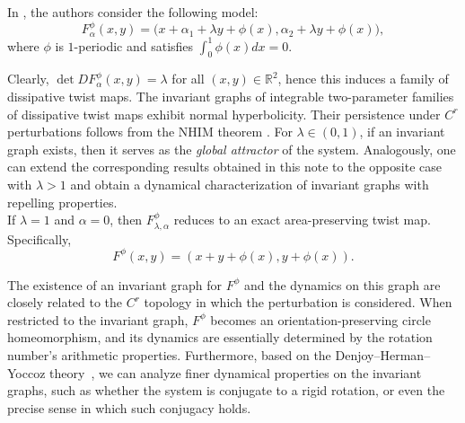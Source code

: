 \documentclass{amsart}
\newcommand{\R}{\mathbb{R}}
\newcommand{\al}{\alpha}
\theoremstyle{definition}
\begin{document}
 In \cite{SoW}, the authors consider the following model:
\begin{equation}\label{Fp}
F^\phi_{\alpha}(x,y) = \big(x + \alpha_1 + \lambda y + \phi(x), \alpha_2 + \lambda y + \phi(x)\big),
\end{equation}
where $\phi$ is $1$-periodic and satisfies $\int_{0}^1 \phi(x) dx = 0$.

Clearly, $\det DF_{\al}^\phi(x,y)=\lambda$ for all $(x,y)\in \R^2$, hence this induces a family of dissipative twist maps. The invariant graphs of integrable two-parameter families of dissipative twist maps exhibit normal hyperbolicity. Their persistence under $C^r$ perturbations follows from the NHIM theorem  \cite{HPS}. For $\lambda \in (0,1)$, if an invariant graph exists, then it serves as the \emph{global attractor} of the system. Analogously, one can extend the corresponding results obtained in this note to the opposite case with $\lambda>1$ and obtain a dynamical characterization of invariant graphs with repelling properties.\\




If $\lambda=1$ and $\alpha=0$, then $F^{\phi}_{\lambda,\alpha}$ reduces to an exact area-preserving twist map. Specifically,
\begin{equation}\label{Fpar}
F^{\phi}(x,y) = (x + y+\phi(x), y + \phi(x)).
\end{equation}

The existence of an invariant graph for $F^{\phi}$ and the dynamics on this graph are closely related to the $C^r$ topology in which the perturbation is considered. When restricted to the invariant graph, $F^{\phi}$ becomes an orientation-preserving circle homeomorphism, and its dynamics are essentially determined by the rotation number's arithmetic properties. Furthermore, based on the {Denjoy--Herman--Yoccoz} theory~\cite{De,H11,Y1}, we can analyze finer dynamical properties on the invariant graphs, such as whether the system is conjugate to a rigid rotation, or even the precise sense in which such conjugacy holds.

 \vspace{1em}
\end{document}
